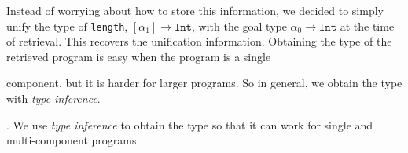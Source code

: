 \documentclass[acmsmall,nonacm]{acmart}
\begin{document}
Instead of worrying about how to store this information,
we decided to simply unify the type of \texttt{length}, $[\alpha_1] \to \texttt{Int}$,
with the goal type $\alpha_0 \to \texttt{Int}$
at the time of retrieval. This recovers the unification information.
Obtaining the type of the retrieved program is easy when the program is a single

component, but it is harder for larger programs. So in general, we obtain the type 
with \textit{type inference}.


. We use \textit{type inference} to obtain the type so that it can 
work for single and multi-component programs. 





  






\end{document}
